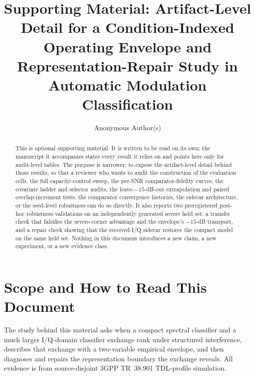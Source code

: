 \documentclass[letterpaper,onecolumn,11pt,journal]{IEEEtran}
\title{Supporting Material: Artifact-Level Detail for a Condition-Indexed
Operating Envelope and Representation-Repair Study in Automatic Modulation
Classification}
\author{Anonymous Author(s)}
\begin{document}
\maketitle

\begin{abstract}
This is optional supporting material. It is written to be read on its own; the
manuscript it accompanies states every result it relies on and points here
only for audit-level tables. The purpose is narrower: to expose the
artifact-level detail behind those results, so that a reviewer who wants to
audit the construction of the evaluation cells, the full capacity-control
sweep, the per-SNR comparator-fidelity curves, the covariate ladder and
selector audits, the leave-$-15$-dB-out extrapolation and paired
overlap-increment tests, the comparator convergence histories, the sidecar
architecture, or the seed-level robustness can do so directly. It also
reports two preregistered post-hoc robustness validations on an
independently generated severe held set: a transfer check that falsifies the
severe-corner advantage and the envelope's $-15$-dB transport, and a repair
check showing that the received-I/Q sidecar restores the compact model on
the same held set. Nothing in this
document introduces a new claim, a new experiment, or a new evidence class.
\end{abstract}

\section{Scope and How to Read This Document}
The study behind this material asks when a compact spectral classifier and a
much larger I/Q-domain classifier exchange rank under structured interference,
describes that exchange with a two-variable empirical envelope, and then
diagnoses and repairs the representation boundary the exchange reveals. All
evidence is from source-disjoint 3GPP TR~38.901 TDL-profile simulation.
\end{document}
